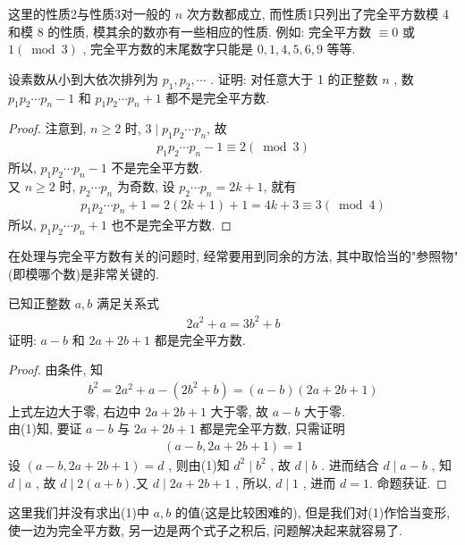 这里的性质2与性质3对一般的 $n$ 次方数都成立, 而性质1只列出了完全平方数模 4 和模 8 的性质, 模其余的数亦有一些相应的性质. 例如: 完全平方数 $\equiv 0$ 或 $1(\bmod 3)$ , 完全平方数的末尾数字只能是 $0,1,4,5,6,9$ 等等.
\begin{example}
	设素数从小到大依次排列为 $p_{1}, p_{2}, \cdots$ . 证明: 对任意大于 1 的正整数 $n$ , 数 $p_{1} p_{2} \cdots p_{n}-1$ 和 $p_{1} p_{2} \cdots p_{n}+1$ 都不是完全平方数.
\end{example}
\begin{proof}
	注意到, $n \geqslant 2$ 时, $3 \mid p_{1} p_{2} \cdots p_{n}$, 故
	\begin{align*}
		p_{1} p_{2} \cdots p_{n}-1 \equiv 2(\bmod 3)
	\end{align*}
	所以, $p_{1} p_{2} \cdots p_{n}-1$ 不是完全平方数.\\
	又 $n \geqslant 2$ 时, $p_{2} \cdots p_{n}$ 为奇数, 设 $p_{2} \cdots p_{n}=2 k+1$, 就有
	\begin{align*}
		p_{1} p_{2} \cdots p_{n}+1=2(2 k+1)+1=4 k+3 \equiv 3(\bmod 4)
	\end{align*}
	所以, $p_{1} p_{2} \cdots p_{n}+1$ 也不是完全平方数.
\end{proof}
\begin{note}
	在处理与完全平方数有关的问题时, 经常要用到同余的方法, 其中取恰当的"参照物"(即模哪个数)是非常关键的.
\end{note}

\begin{example}
	已知正整数 $a ,  b$ 满足关系式
	\begin{align*}
		2 a^{2}+a=3 b^{2}+b
	\end{align*}
	证明: $a-b$ 和 $2 a+2 b+1$ 都是完全平方数.
\end{example}
\begin{proof}
	由条件, 知
	\begin{align*}
		b^{2}=2 a^{2}+a-\left(2 b^{2}+b\right)=(a-b)(2 a+2 b+1)
	\end{align*}
	上式左边大于零, 右边中 $2 a+2 b+1$ 大于零, 故 $a-b$ 大于零. \\
	由(1)知, 要证 $a-b$ 与 $2 a+2 b+1$ 都是完全平方数, 只需证明
	\begin{align*}
		(a-b, 2 a+2 b+1)=1
	\end{align*}
	设 $(a-b, 2 a+2 b+1)=d$ , 则由(1)知 $d^{2} \mid b^{2}$ , 故 $d \mid b$ . 进而结合 $d \mid a-b$ , 知 $d \mid a$ , 故 $d \mid 2(a+b)$.又 $d \mid 2 a+2 b+1$ , 所以,  $d \mid 1$ , 进而 $d=1$.
	命题获证.
\end{proof}
\begin{note}
	这里我们并没有求出(1)中 $a ,  b$ 的值(这是比较困难的), 但是我们对(1)作恰当变形, 使一边为完全平方数, 另一边是两个式子之积后, 问题解决起来就容易了.
\end{note}

